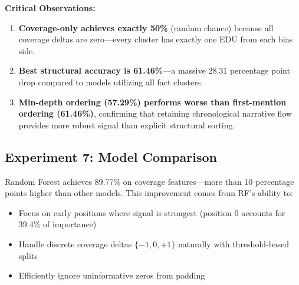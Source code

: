 \documentclass[11pt]{article}
\begin{document}
\textbf{Critical Observations:}
\begin{enumerate}
    \item \textbf{Coverage-only achieves exactly 50\%} (random chance) because all coverage deltas are zero---every cluster has exactly one EDU from each bias side.
    \item \textbf{Best structural accuracy is 61.46\%}---a massive 28.31 percentage point drop compared to models utilizing all fact clusters.
    \item \textbf{Min-depth ordering (57.29\%) performs worse than first-mention ordering (61.46\%)}, confirming that retaining chronological narrative flow provides more robust signal than explicit structural sorting.
\end{enumerate}

\subsection{Experiment 7: Model Comparison}

\begin{table}[t]
\centering
{}
\caption{Model comparison with bipartite features. Random Forest dramatically outperforms other models.}
\label{tab:models}
\end{table}

Random Forest achieves 89.77\% on coverage features---more than 10 percentage points higher than other models. This improvement comes from RF's ability to:
\begin{itemize}
    \item Focus on early positions where signal is strongest (position 0 accounts for 39.4\% of importance)
    \item Handle discrete coverage deltas $\{-1, 0, +1\}$ naturally with threshold-based splits
    \item Efficiently ignore uninformative zeros from padding
\end{itemize}
\end{document}
